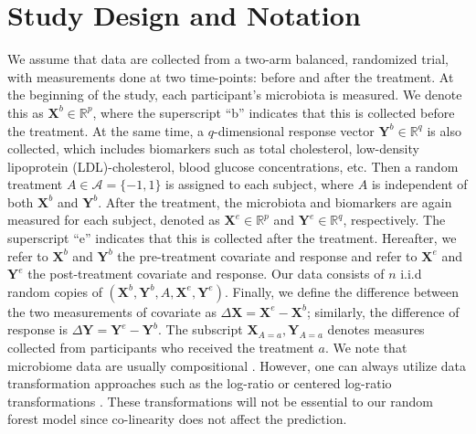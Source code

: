 \documentclass[smallextended]{svjour3}
\begin{document}
\section{Study Design and Notation}\label{Notation}

We assume that data are collected from a two-arm balanced, randomized trial, with measurements done at two time-points: before and after the treatment. At the beginning of the study, each participant's microbiota is measured. We denote this as $\bm{X}^b \in \mathbb{R}^p$, where the superscript ``b'' indicates that this is collected before the treatment. At the same time, a $q$-dimensional response vector $\bm{Y}^b \in \mathbb{R}^q$ is also collected, which includes biomarkers such as total cholesterol, low-density lipoprotein (LDL)-cholesterol, blood glucose concentrations, etc. Then a random treatment $A \in \mathcal{A} = \{-1,1\}$ is assigned to each subject, where $A$ is independent of both $\bm{X}^b$ and $\bm{Y}^b$. After the treatment, the microbiota and biomarkers are again measured for each subject, denoted as $\bm X^e \in \mathbb{R}^p$ and $\bm Y^e \in \mathbb{R}^q$, respectively. The superscript ``e'' indicates that this is collected after the treatment. Hereafter, we refer to $\bm X^b$ and $\bm Y^b$ the pre-treatment covariate and response and refer to $\bm X^e$ and $\bm Y^e$ the post-treatment covariate and response. Our data consists of $n$ i.i.d random copies of $(\bm X^b, \bm Y^b, A, \bm X^e, \bm Y^e)$. Finally, we define the difference between the two measurements of covariate as $\Delta \bm X = \bm X^e - \bm X^b$; similarly, the difference of response is $\Delta \bm Y = \bm Y^e - \bm Y^b$. The subscript $ \textbf{X}_{A=a}, \textbf{Y}_{A=a}$ denotes measures collected from participants who received the treatment $a$. We note that microbiome data are usually compositional \citep{li2019statistical}. However, one can always utilize data transformation approaches such as the log-ratio or centered log-ratio transformations \citep{egozcue2003isometric}. These transformations will not be essential to our random forest model since co-linearity does not affect the prediction.
\end{document}
